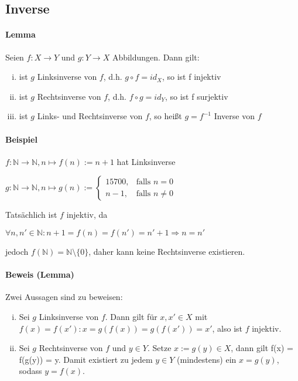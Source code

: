 \documentclass[12pt,a4paper,parskip=half-,DIV=15]{scrartcl}
\begin{document}
\subsection{Inverse}
\paragraph{Lemma} Seien $ f:X\to Y $ und $ g:Y\to X $ Abbildungen. Dann gilt:
\begin{enumerate}[i)]
\item ist $ g $ Linksinverse von $ f $, d.h. $ g\circ f = id_X $, so ist f injektiv
\item ist $ g $ Rechtsinverse von $ f $, d.h. $ f\circ g = id_Y$, so ist f surjektiv
\item ist $ g $ Links- und Rechtsinverse von $ f $, so heißt $ g =f^{-1}$ Inverse von $ f $
\end{enumerate}
\paragraph{Beispiel} $ f:\mathbb{N}\to \mathbb{N}, n\mapsto f(n):= n+1 $ hat Linksinverse 
\begin{center}
$ g:\mathbb{N} \to \mathbb{N}, n\mapsto g(n):=\left\{
\begin{array}{cl}
15700, & \text{falls } n=0\\
n-1, & \text{falls } n\neq 0
\end{array} \right. $
\end{center}
Tatsächlich ist $ f $ injektiv, da
\begin{center}
$ \forall n,n'\in \mathbb{N} : n+1 = f(n) = f(n') = n'+1 \Rightarrow n=n' $
\end{center}
jedoch $ f(\mathbb{N}) = \mathbb{N}\setminus \{0\} $, daher kann keine Rechtsinverse existieren.
\paragraph{Beweis (Lemma)} Zwei Aussagen sind zu beweisen:
\begin{enumerate}[i)]
\item Sei $ g $ Linksinverse von $ f $. Dann gilt für $ x,x'\in X $ mit \\$ f(x) = f(x'): x = g(f(x)) = g(f(x')) = x' $, also ist $ f $ injektiv.
\item Sei $g $ Rechtsinverse von $ f $ und $ y\in Y $. Setze $ x:= g(y)\in X $, dann gilt f(x) = f(g(y)) = y. Damit existiert zu jedem $ y\in Y $ (mindestens) ein $ x = g(y) $, sodass  $ y=f(x) $.
\end{enumerate}
\end{document}
